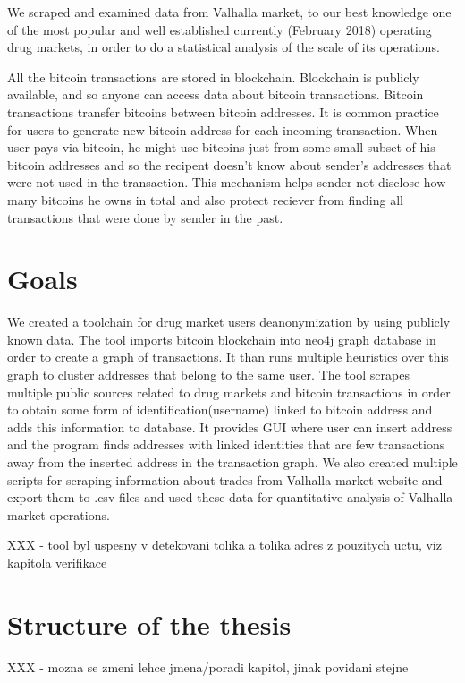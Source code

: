 \documentclass[
  digital, %
  table,   %
  lof,     %
  lot,     %
  oneside
]{fithesis3}
\begin{document}
We scraped and examined data from Valhalla market,
 to our best knowledge one of the most popular and well established currently (February 2018) operating drug markets,
in order to do a statistical analysis of the scale of its operations.

All the bitcoin transactions are stored in blockchain. Blockchain is
publicly available, and so anyone can access data about bitcoin transactions.
Bitcoin transactions transfer bitcoins between bitcoin addresses. It is common practice for users
to generate new bitcoin address for each incoming transaction.
When user pays via bitcoin, he might use bitcoins just from some small subset of his bitcoin addresses
and so the recipent doesn't know about sender's addresses that were not used in the transaction.
This mechanism helps sender not disclose how many bitcoins he owns in total and also
protect reciever from finding all transactions that were done by sender in the past.

\section{Goals}

We created a toolchain for drug market users deanonymization by using publicly known data.
The tool imports bitcoin blockchain into neo4j graph database in order to create a graph of transactions.
It than runs multiple heuristics over this graph to cluster addresses that belong to the same user.
The tool scrapes multiple public sources related to drug markets and bitcoin transactions in order
to obtain some form of identification(username) linked to bitcoin address and adds this information to database.
It provides GUI where user can insert address and the program finds addresses with linked identities
that are few transactions away from the inserted address in the transaction graph.
We also created multiple scripts for scraping information about trades from Valhalla market website
and export them to .csv files and used these data for quantitative analysis of Valhalla market operations.

XXX - tool byl uspesny v detekovani tolika a tolika adres z pouzitych uctu, viz kapitola verifikace

\section{Structure of the thesis}
XXX - mozna se zmeni lehce jmena/poradi kapitol, jinak povidani stejne
\end{document}
